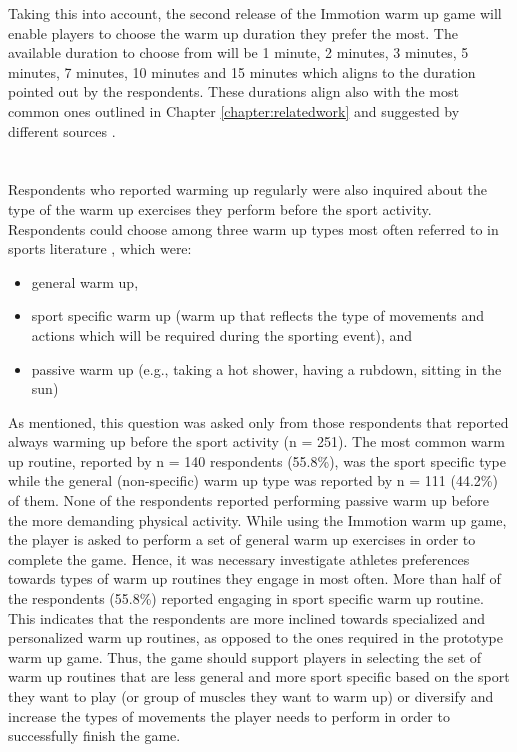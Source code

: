 Taking this into account, the second release of the Immotion warm up game will enable players to choose the warm up duration they prefer the most. The available duration to choose from will be 1 minute, 2 minutes, 3 minutes, 5 minutes, 7 minutes, 10 minutes and 15 minutes which aligns to the duration pointed out by the respondents. These durations align also with the most common ones outlined in Chapter \ref{chapter:relatedwork} and suggested by different sources \cite{bishop2003warm2}.\\\\\\Respondents who reported warming up regularly were also inquired about the type of the warm up exercises they perform before the sport activity. Respondents could choose among three warm up types most often referred to in sports literature \cite{shellock1985warming, bishop2003warm2}, which were: 
\begin{itemize}
\item general warm up,
\item sport specific warm up (warm up that reflects the type of movements and actions which will be required during the sporting event), and 
\item passive warm up (e.g., taking a hot shower, having a rubdown, sitting in the sun)
\end{itemize} As mentioned, this question was asked only from those respondents that reported always warming up before the sport activity (n = 251). The most common warm up routine, reported by n = 140 respondents (55.8\%), was the sport specific type while the general (non-specific) warm up type was reported by n = 111 (44.2\%) of them. None of the respondents reported performing passive warm up before the more demanding physical activity. While using the Immotion warm up game, the player is asked to perform a set of general warm up exercises in order to complete the game. Hence, it was necessary investigate athletes preferences towards types of warm up routines they engage in most often. More than half of the respondents (55.8\%) reported engaging in sport specific warm up routine. This indicates that the respondents are more inclined towards specialized and personalized warm up routines, as opposed to the ones required in the prototype warm up game. Thus, the game should support players in selecting the set of warm up routines that are less general and more sport specific based on the sport they want to play (or group of muscles they want to warm up) or diversify and increase the types of movements the player needs to perform in order to successfully finish the game. %
